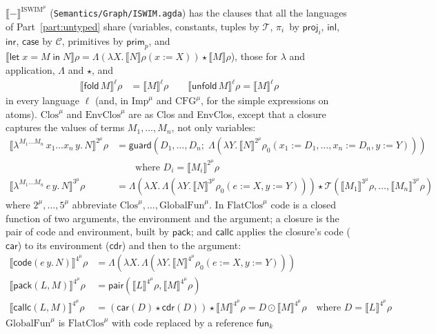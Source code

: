 \documentclass[10pt]{article}
\theoremstyle{acmplain}
\newcommand{\SEM}[1]{\llbracket #1 \rrbracket}
\newcommand{\key}[1]{\mathsf{#1}}
\newcommand{\clos}[2]{\lambda^{#1}\, #2.\,}
\newcommand{\Let}{\key{let}\;}
\newcommand{\In}{\;\key{in}\;}
\newcommand{\prj}[1]{\pi_{#1}\,}
\newcommand{\funref}[1]{\key{fun}_{#1}}
\newcommand{\ext}[3]{#1(#2{:=}#3)}
\newcommand{\app}{\star}
\newcommand{\Tcodetm}[3]{\key{code}(#1\,#2.\,#3)}  %
\newcommand{\Tpack}[2]{\key{pack}(#1, #2)}     %
\newcommand{\Tcallc}[2]{\key{callc}(#1, #2)}   %
\newcommand{\Ml}[1]{\textrm{#1}^{\mu}}                  %
\newcommand{\Mfold}{\key{fold}\,}
\newcommand{\Munfold}{\key{unfold}\,}
\begin{document}
$\SEM{-}^{\Ml{ISWIM}}$ (\texttt{Semantics/Graph/ISWIM.agda}) has the clauses
that all the languages of Part~\ref{part:untyped} share (variables,
constants, tuples by $\mathcal{T}$, $\prj{i}$ by $\key{proj}_i$,
$\key{inl}$, $\key{inr}$, $\key{case}$ by $\mathcal{C}$, primitives by
$\key{prim}_p$, and
$\SEM{\Let x = M \In N}\rho = \Lambda(\lambda X.\, \SEM{N}\ext{\rho}{x}{X}) \app \SEM{M}\rho$),
those for $\lambda$ and application, $\Lambda$ and $\app$, and
\begin{align*}
  \SEM{\Mfold M}^{\ell}\rho &= \SEM{M}^{\ell}\rho \qquad
  \SEM{\Munfold M}^{\ell}\rho = \SEM{M}^{\ell}\rho
\end{align*}
in every language $\ell$ (and, in $\Ml{Imp}$ and $\Ml{CFG}$, for the simple
expressions on atoms). $\Ml{Clos}$ and $\Ml{EnvClos}$ are as Clos and EnvClos,
except that a closure captures the values of terms $M_1, \ldots, M_n$, not
only variables:
\begin{align*}
  \SEM{\clos{M_1\ldots M_n}{x_1\ldots x_n\, y} N}^{\Ml{2}}\rho &=
    \key{guard}(D_1, \ldots, D_n;\;
       \Lambda(\lambda Y.\, \SEM{N}^{\Ml{2}}\rho_0(x_1{:=}D_1,\ldots,x_n{:=}D_n, y{:=}Y))) \\
    &\qquad\text{where } D_i = \SEM{M_i}^{\Ml{2}}\rho \\
  \SEM{\clos{M_1\ldots M_n}{e\, y} N}^{\Ml{3}}\rho &=
    \Lambda(\lambda X.\, \Lambda(\lambda Y.\, \SEM{N}^{\Ml{3}}\rho_0(e{:=}X, y{:=}Y)))
    \app \mathcal{T}(\SEM{M_1}^{\Ml{3}}\rho, \ldots, \SEM{M_n}^{\Ml{3}}\rho)
\end{align*}
where $\Ml{2}, \ldots, \Ml{5}$ abbreviate $\Ml{Clos}, \ldots, \Ml{GlobalFun}$.
In $\Ml{FlatClos}$ code is a closed function of two arguments, the
environment and the argument; a closure is the pair of code and
environment, built by $\key{pack}$; and $\key{callc}$ applies the
closure's code ($\key{car}$) to its environment ($\key{cdr}$) and then to
the argument:
\begin{align*}
  \SEM{\Tcodetm{e}{y}{N}}^{\Ml{4}}\rho &= \Lambda(\lambda X.\, \Lambda(\lambda Y.\, \SEM{N}^{\Ml{4}}\rho_0(e{:=}X, y{:=}Y))) \\
  \SEM{\Tpack{L}{M}}^{\Ml{4}}\rho &= \key{pair}(\SEM{L}^{\Ml{4}}\rho, \SEM{M}^{\Ml{4}}\rho) \\
  \SEM{\Tcallc{L}{M}}^{\Ml{4}}\rho &= (\key{car}(D) \app \key{cdr}(D)) \app \SEM{M}^{\Ml{4}}\rho
    = D \odot \SEM{M}^{\Ml{4}}\rho
    \quad\text{where } D = \SEM{L}^{\Ml{4}}\rho
\end{align*}
$\Ml{GlobalFun}$ is $\Ml{FlatClos}$ with code replaced by a reference $\funref{k}$
\end{document}
